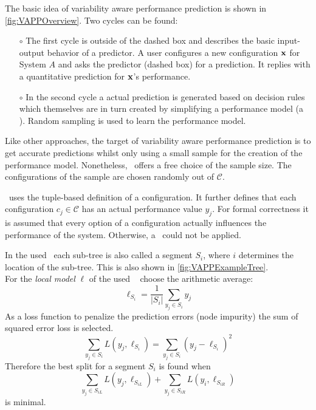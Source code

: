 The basic idea of variability aware performance prediction is shown in \cref{fig:VAPPOverview}.
Two cycles can be found:	
\FloatBarrier 
\begin{itemize}	
	\item[$\circ$] The first cycle is outside of the dashed box and describes the basic input-output behavior of a predictor. A user configures a new configuration $\mathrm{\mathbf{x}}$ for System $A$ and asks the predictor (dashed box) for a prediction. It replies with a quantitative prediction for $\mathrm{\mathbf{x}}$'s performance.
	\item[$\circ$]  In the second cycle a actual prediction is generated based on decision rules which themselves are in turn created by simplifying a performance model (a \CART). Random sampling is used to learn the performance model.
\end{itemize}
Like other approaches, the target of variability aware performance prediction is to get accurate predictions whilst only using a small sample for the creation of the performance model. Nonetheless, \VAPP~offers a free choice of the sample size. The configurations of the sample are chosen randomly out of $\mathcal{C}$. 

\VAPP~uses the tuple-based definition of a configuration. It further defines that each configuration $c_j \in \mathcal{C}$ has an actual performance value $y_j$. For formal correctness it is assumed that every option of a configuration actually influences the performance of the system. Otherwise, a \CART~could not be applied.

In the used \CART~each sub-tree is also called a segment $S_i$, where $i$ determines the location of the sub-tree. This is also shown in \cref{fig:VAPPExampleTree}.\\
For the \textit{local model} $\ell$ of the used \CART~\citet{VariabilityAwarePerformancePredictionJianmeiSigmundApel} choose the arithmetic average:
\begin{equation}
	\ell_{S_i} = \frac{1}{|S_i|} \sum_{y_j \in S_i} y_j
\end{equation}
As a loss function to penalize the prediction errors (node impurity) the sum of squared error loss is selected.
\begin{equation}
	\sum_{y_j \in S_i} L(y_j,\ell_{S_i}) = \sum_{y_j \in S_i} (y_j - \ell_{S_i})^2
\end{equation}
Therefore the best split for a segment $S_i$ is found when
\begin{equation*}
\sum_{y_j \in S_{iL}} L(y_j,\ell_{S_{iL}}) + \sum_{y_j \in S_{iR}} L(y_i,\ell_{S_{iR}})
\end{equation*}
is minimal.

